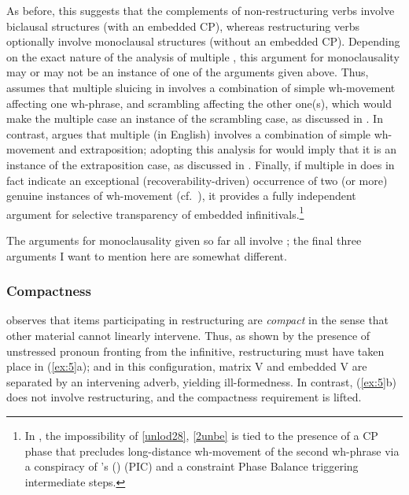 \documentclass[output=paper]{langsci/langscibook}
\newcommand{\scite}[2]{\citeauthor{#2}#1 (\citeyear{#2})}
\begin{document}
\largerpage[-1]
As before, this suggests that the complements of non-restructuring verbs
involve biclausal structures (with an embedded CP), whereas  restructuring
verbs optionally involve monoclausal structures (without an embedded CP).
Depending on the exact nature of the analysis of multiple , this
argument for monoclausality may or may not be an instance of one of the
arguments given above. Thus, \cite{Sauerland:99:loc} assumes that multiple
sluicing in  involves a combination of simple wh-movement affecting one
wh-phrase, and scrambling affecting the other one(s), which would make the
multiple  case an instance of the scrambling case, as discussed in
. In contrast, \cite{Lasnik:14:mul} argues that multiple  (in
English) involves a combination of simple wh-movement and extraposition;
adopting this analysis for  would imply that it is an instance of the
extraposition case, as discussed in .  Finally, if multiple 
in  does in fact indicate an exceptional (recoverability-driven)
occurrence of two (or more) genuine instances of wh-movement (cf.\
\citealt{Merchant2001,Heck&Mueller:03:vers}), it provides a fully
independent argument for selective transparency of embedded
infinitivals.\footnote{In \cite{Heck&Mueller:03:vers}, the impossibility of
    \eqref{unlod28}, \eqref{2unbe} is tied to the presence of a CP phase that
    precludes long-distance wh-movement of the second wh-phrase via a
    conspiracy of \scite{'s}{Chomsky2001} 
(\glsunset{PIC}\gls{PIC}) and a constraint Phase Balance triggering
intermediate \isi{movement} steps.}

The arguments for monoclausality given so far all involve ; the final
three arguments I want to mention here are somewhat different.

\subsubsection{\label{m5}Compactness}

\cite{Haider:10} observes that items participating in restructuring are {\it compact} in the sense
that other material cannot linearly intervene. Thus, as shown by the
presence of unstressed pronoun fronting\is{fronting!of pronouns} from the infinitive,
restructuring must have taken place in (\ref{ex:5}a); and in this
configuration, matrix V and embedded V are separated by an intervening adverb,
yielding ill-formedness. In contrast, (\ref{ex:5}b) does not involve
restructuring, and the compactness requirement is lifted.
\end{document}
